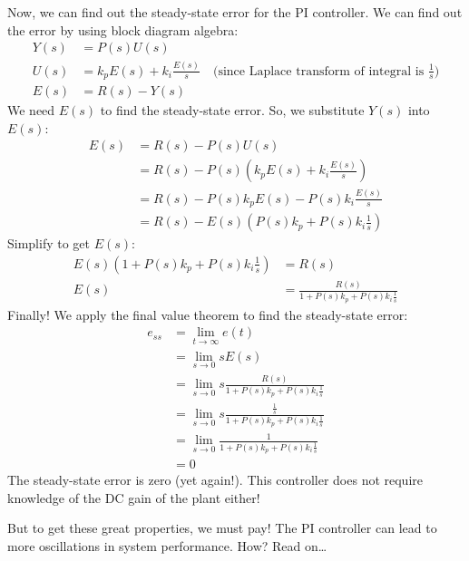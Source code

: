 \documentclass{ee122_notes}
\begin{document}
Now, we can find out the steady-state error for the PI controller. We can find out the error by using block diagram algebra:
\begin{align*}
    Y(s) &= P(s) U(s) \\
    U(s) &= k_p E(s) + k_i \frac{E(s)}{s} \quad \text{(since Laplace transform of integral is $\frac{1}{s}$)} \\
    E(s) &= R(s) - Y(s)
\end{align*}
We need $E(s)$ to find the steady-state error. So, we substitute $Y(s)$ into $E(s)$:
\begin{align*}
    E(s) &= R(s) - P(s) U(s) \\
    &= R(s) - P(s) \left(k_p E(s) + k_i \frac{E(s)}{s}\right) \\
    &= R(s) - P(s) k_p E(s) - P(s) k_i \frac{E(s)}{s} \\
    &= R(s) - E(s) \left(P(s) k_p + P(s) k_i \frac{1}{s}\right)
\end{align*}
Simplify to get $E(s)$:
\begin{align*}
    E(s) \left(1 + P(s) k_p + P(s) k_i \frac{1}{s}\right) &= R(s) \\
    E(s) &= \frac{R(s)}{1 + P(s) k_p + P(s) k_i \frac{1}{s}}
\end{align*}
Finally! We apply the final value theorem to find the steady-state error:
\begin{align*}
    e_{ss} &= \lim_{t \to \infty} e(t) \\
    &= \lim_{s \to 0} s E(s) \\
    &= \lim_{s \to 0} s \frac{R(s)}{1 + P(s) k_p + P(s) k_i \frac{1}{s}} \\
    &= \lim_{s \to 0} s \frac{\frac{1}{s}}{1 + P(s) k_p + P(s) k_i \frac{1}{s}} \\
    &= \lim_{s \to 0} \frac{1}{1 + P(s) k_p + P(s) k_i \frac{1}{s}} \\
    &= 0
\end{align*}
The steady-state error is zero (yet again!). This controller does not require knowledge of the DC gain of the plant either! 

But to get these great properties, we must pay! The PI controller can lead to more oscillations in system performance. How? Read on\dots
\end{document}
